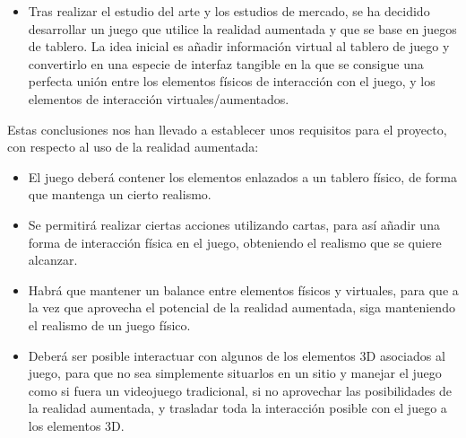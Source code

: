 \begin{itemize}
  \item Tras realizar el estudio del arte y los estudios de mercado, se ha decidido desarrollar un juego que utilice la realidad aumentada y que se base en juegos de tablero. La idea inicial es añadir información virtual al tablero de juego y convertirlo en una especie de interfaz tangible en la que se consigue una perfecta unión entre los elementos físicos de interacción con el juego, y los elementos de interacción virtuales/aumentados.

\end{itemize}

Estas conclusiones nos han llevado a establecer unos requisitos para el proyecto, con respecto al uso de la realidad aumentada:

\begin{itemize}
  \item El juego deberá contener los elementos enlazados a un tablero físico, de forma que mantenga un cierto realismo.

  \item Se permitirá realizar ciertas acciones utilizando cartas, para así añadir una forma de interacción física en el juego, obteniendo el realismo que se quiere alcanzar.

  \item Habrá que mantener un balance entre elementos físicos y virtuales, para que a la vez que aprovecha el potencial de la realidad aumentada, siga manteniendo el realismo de un juego físico.

  \item Deberá ser posible interactuar con algunos de los elementos 3D asociados al juego, para que no sea simplemente situarlos en un sitio y manejar el juego como si fuera un videojuego tradicional, si no aprovechar las posibilidades de la realidad aumentada, y trasladar toda la interacción posible con el juego a los elementos 3D.

\end{itemize}
